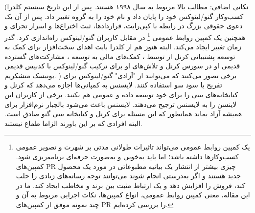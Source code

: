 (نکاتی اضافی: مطالب بالا مربوط به سال ۱۹۹۸ هستند. پس از این تاریخ سیستم کلدرا کسب‌وکار گنو/لینوکس
خود را پایان داد و نام خود را به گروه  تغییر داد. پس از آن یک دعوی حقوقی بزرگ در رابطه با
کپی‌رایت، قراردادها، ثبت اختراع‌ها و اسرار تجرای و همچنین یک کمپین روابط عمومی
\footnote{
یک کمپین روابط عمومی می‌تواند تاثیرات طولانی مدتی بر شهرت و تصویر عمومی کسب‌وکارها داشته باشد؛
اما باید به‌خوبی و به‌صورت حرفه‌ای برنامه‌ریزی شود. کمپین‌های PR چیزی بیشتر از انتشار یک بیانیه مطبوعاتی
در مورد یک محصول جدید هستند و اگر به‌درستی انجام شوند می‌توانند توجه رسانه‌های زیادی را جلب کند،
فروش را افزایش دهد و یک ارتباط مثبت بین برند و مخاطب ایجاد کند. ما در این مقاله، معنی کمپین روابط عمومی،
انواع کمپین‌ها، نکات اجرایی مربوط به آن و چند نمونه موفق از کمپین‌های PR را بررسی کرده‌ایم.
}
در مقابل کاربران گنو/لینوکس راه‌اندازی کرد. گذر زمان تغییر ایجاد می‌کند.
البته هنوز هم از کلدرا بابت اهدای سخت‌افزار برای کمک به توسعه پشتیبانی کرنل از  توسط
،
کمک‌های مالی به توسعه  ، مشارکت‌های گسترده قدیمی او در سورس کرنل و تلاش‌های او
برای ترکیب گنو/لینوکس با کدبیس قدیمی یونیسک متشکریم.
)
برخی تصور می‌کنند که می‌توانند از "آزادی" گنو/لینوکس برای تفریح یا سود سو استفاده کنند.
لایسنس   به کمپانی‌ها اجازه می‌دهد که کرنل و کتابخانه‌های سی را برای خود توسعه
داده و عمومی هم نکنند. برخی از کاربران این لاینسن را به لایسنس  ترجیح می‌دهند.
لایسنس  باعث می‌شود بالجبار نرم‌افزار برای همیشه آزاد بماند همانطور که این مسئله
برای کرنل و کتابخانه سی گنو صادق است. البته افرادی که بر این باورند الزاما طماع نیستند.



